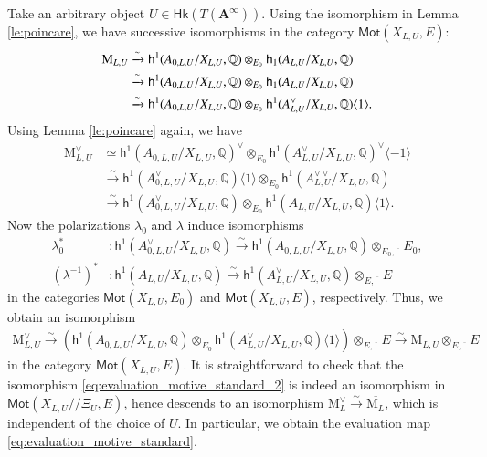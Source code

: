 \documentclass[12pt]{amsart}
\numberwithin{equation}{section}
\theoremstyle{plain}
\theoremstyle{definition}
\theoremstyle{remark}
\renewcommand{\b}[1]{\mathbf{#1}}
\renewcommand{\d}[1]{\mathbb{#1}}
\renewcommand{\r}[1]{\mathrm{#1}}
\renewcommand{\sf}[1]{\mathsf{#1}}
\renewcommand{\(}{\left(}
\renewcommand{\)}{\right)}
\newcommand{\ang}[1]{\langle{#1}\rangle}
\newcommand{\ol}[1]{\overline{#1}{}}
\newcommand{\bA}{\b A}
\newcommand{\dQ}{\d Q}
\newcommand{\rM}{\r M}
\newcommand{\sfh}{\sf h}
\newcommand{\Hk}{\sf{Hk}}
\newcommand{\Mot}{\sf{Mot}}
\begin{document}
Take an arbitrary object $U\in\Hk(T(\bA^\infty))$. Using the isomorphism in Lemma \ref{le:poincare}, we have successive isomorphisms in the category $\Mot(X_{L,U},E)$:
\begin{align}\label{eq:evaluation_motive_standard_1}
\rM_{L,U}&\xrightarrow\sim\sfh^1(A_{0,L,U}/X_{L,U},\dQ)\otimes_{E_0}\sfh_1(A_{L,U}/X_{L,U},\dQ)\\
&\xrightarrow\sim\sfh^1(A_{0,L,U}/X_{L,U},\dQ)\otimes_{E_0}\sfh_1(A_{L,U}/X_{L,U},\dQ)  \notag\\
&\xrightarrow\sim\sfh^1(A_{0,L,U}/X_{L,U},\dQ)\otimes_{E_0}\sfh^1(A_{L,U}^\vee /X_{L,U},\dQ)\ang{1}. \notag
\end{align}
Using Lemma \ref{le:poincare} again, we have
\begin{align*}
\rM_{L,U}^\vee&\simeq\sfh^1(A_{0,L,U}/X_{L,U},\dQ)^\vee\otimes_{E_0}\sfh^1(A_{L,U}^\vee /X_{L,U},\dQ)^\vee\ang{-1} \\
&\xrightarrow\sim\sfh^1(A_{0,L,U}^\vee/X_{L,U},\dQ)\ang{1}\otimes_{E_0}\sfh^1(A_{L,U}^{\vee\vee}/X_{L,U},\dQ) \\
&\xrightarrow\sim\sfh^1(A_{0,L,U}^\vee/X_{L,U},\dQ)\otimes_{E_0}\sfh^1(A_{L,U}/X_{L,U},\dQ)\ang{1}.
\end{align*}
Now the polarizations $\lambda_0$ and $\lambda$ induce isomorphisms
\begin{align*}
\lambda_0^*&\colon\sfh^1(A_{0,L,U}^\vee/X_{L,U},\dQ)\xrightarrow\sim\sfh^1(A_{0,L,U}/X_{L,U},\dQ)\otimes_{E_0,\ol{\phantom{a}}}E_0, \\
(\lambda^{-1})^*&\colon\sfh^1(A_{L,U}/X_{L,U},\dQ)\xrightarrow\sim\sfh^1(A_{L,U}^\vee/X_{L,U},\dQ)\otimes_{E,\ol{\phantom{a}}}E
\end{align*}
in the categories $\Mot(X_{L,U},E_0)$ and $\Mot(X_{L,U},E)$, respectively. Thus, we obtain an isomorphism
\begin{align}\label{eq:evaluation_motive_standard_2}
\rM_{L,U}^\vee\xrightarrow\sim
\(\sfh^1(A_{0,L,U}/X_{L,U},\dQ)\otimes_{E_0}\sfh^1(A_{L,U}^\vee /X_{L,U},\dQ)\ang{1}\)\otimes_{E,\ol{\phantom{a}}}E\xrightarrow\sim\rM_{L,U}\otimes_{E,\ol{\phantom{a}}}E
\end{align}
in the category $\Mot(X_{L,U},E)$. It is straightforward to check that the isomorphism \eqref{eq:evaluation_motive_standard_2} is indeed an isomorphism in $\Mot(X_{L,U}/\!\!/\Xi_U,E)$, hence descends to an isomorphism $\rM_L^\vee\xrightarrow\sim\ol{\rM_L}$, which is independent of the choice of $U$. In particular, we obtain the evaluation map \eqref{eq:evaluation_motive_standard}.
\end{document}
